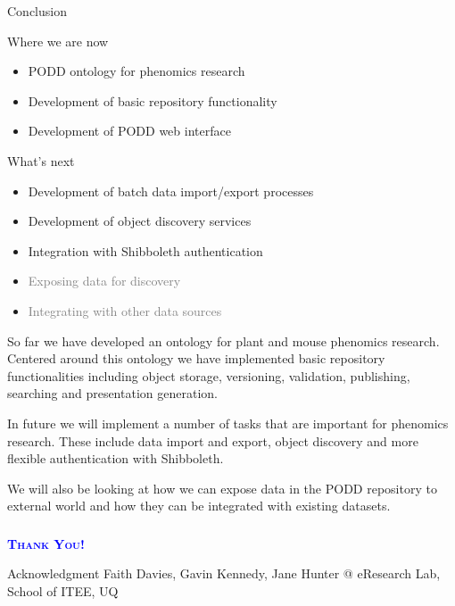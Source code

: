 \documentclass[ignorenonframetext,compress]{beamer}
\begin{document}
\begin{frame}{Conclusion}
\begin{block}{Where we are now}
\begin{itemize}
\item PODD ontology for phenomics research
\item Development of basic repository functionality
\item Development of PODD web interface
\end{itemize}
\end{block}
\pause
\begin{block}{What's next}
\begin{itemize}
\item Development of batch data import/export processes
\item Development of object discovery services
\item Integration with Shibboleth authentication 
\item \textcolor{gray}{Exposing data for discovery}
\item \textcolor{gray}{Integrating with other data sources}
\end{itemize}
\end{block}
\end{frame}

So far we have developed an ontology for plant and
mouse phenomics research. Centered around this ontology
we have implemented basic repository functionalities
including object storage, versioning, validation, 
publishing, searching and presentation generation. 

In future we will implement a number of tasks that are
important for phenomics research. These include data
import and export, object discovery and more flexible
authentication with Shibboleth.

We will also be looking at how we can expose data in
the PODD repository to external world and how they 
can be integrated with existing datasets.

\begin{frame}
	\frametitle{}
    \begin{center}
\Huge \textsc{\textcolor{blue}{\textbf{Thank You!}}}
\end{center}
\vspace{+20pt}
\begin{block}{Acknowledgment}
Faith Davies, Gavin Kennedy, Jane Hunter @
eResearch Lab, School of ITEE, UQ
\end{block}
\end{frame}
\end{document}
